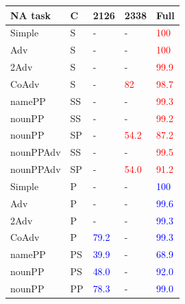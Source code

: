 \begin{center}
\begin{table}[ht]
\centering
\begin{tabular}{|P{2.3cm}|P{0.4cm}||P{0.6cm}|P{0.6cm}|P{0.6cm}|}
\hline
\B NA task & \B C & \B \textbf{\unit{2}{126}} & \B \textbf{\unit{2}{338}} & \B Full \\
\hline


Simple & S & - &  - &  \textcolor{red}{100} \\

Adv & S & - &  - &  \textcolor{red}{100} \\

2Adv & S & - &  - &  \textcolor{red}{99.9} \\

CoAdv & S & - &  \textcolor{red}{82} &  \textcolor{red}{98.7} \\

namePP & SS & - &  - &  \textcolor{red}{99.3} \\

nounPP & SS & - &  - &  \textcolor{red}{99.2} \\

nounPP & SP &  - &  \textcolor{red}{54.2} &  \textcolor{red}{87.2} \\

nounPPAdv & SS &  - &  - & \textcolor{red}{99.5} \\

nounPPAdv & SP &  - &  \textcolor{red}{54.0} & \textcolor{red}{91.2} \\


\hline
Simple & P &  - &  - &  \textcolor{blue}{100} \\

Adv & P &  - &  - &  \textcolor{blue}{99.6} \\

2Adv & P & - &  - &   \textcolor{blue}{99.3} \\

CoAdv & P &  \textcolor{blue}{79.2} &  - &   \textcolor{blue}{99.3} \\

namePP & PS & \textcolor{blue}{39.9} &  - &   \textcolor{blue}{68.9} \\

nounPP & PS &  \textcolor{blue}{48.0} & - &   \textcolor{blue}{92.0} \\

nounPP & PP &  \textcolor{blue}{78.3} & - &   \textcolor{blue}{99.0} \\


\end{tabular}
\end{table}
\end{center}

